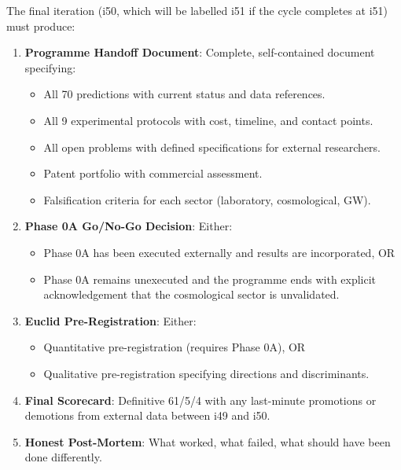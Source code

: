 \documentclass[11pt,a4paper]{article}
\begin{document}
\begin{tcolorbox}[colback=red!5!white, colframe=red!60!black,
  title={i50 REQUIREMENTS: The Final Iteration}]

The final iteration (i50, which will be labelled i51 if the cycle completes at i51) must produce:

\begin{enumerate}
\item \textbf{Programme Handoff Document}: Complete, self-contained document specifying:
\begin{itemize}
\item All 70 predictions with current status and data references.
\item All 9 experimental protocols with cost, timeline, and contact points.
\item All open problems with defined specifications for external researchers.
\item Patent portfolio with commercial assessment.
\item Falsification criteria for each sector (laboratory, cosmological, GW).
\end{itemize}

\item \textbf{Phase 0A Go/No-Go Decision}: Either:
\begin{itemize}
\item Phase 0A has been executed externally and results are incorporated, OR
\item Phase 0A remains unexecuted and the programme ends with explicit acknowledgement that the cosmological sector is unvalidated.
\end{itemize}

\item \textbf{Euclid Pre-Registration}: Either:
\begin{itemize}
\item Quantitative pre-registration (requires Phase 0A), OR
\item Qualitative pre-registration specifying directions and discriminants.
\end{itemize}

\item \textbf{Final Scorecard}: Definitive 61/5/4 with any last-minute promotions or demotions from external data between i49 and i50.

\item \textbf{Honest Post-Mortem}: What worked, what failed, what should have been done differently.
\end{enumerate}
\end{tcolorbox}
\end{document}
